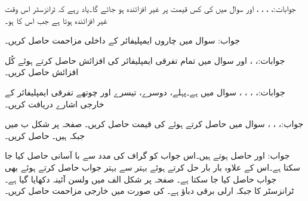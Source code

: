 جوابات:، ، ، ،  اور 
سوال  میں  کی کس قیمت پر  غیر افزائندہ ہو جائے گا۔یاد رہے کہ ٹرانزسٹر اس وقت غیر افزائندہ ہوتا ہے جب اس کا  ہو۔

جواب: 
سوال  میں چاروں ایمپلیفائر کے داخلی مزاحمت حاصل کریں۔

جوابات:، ،  اور 
سوال  میں  تمام تفرقی ایمپلیفائر کی افزائش حاصل کرتے ہوئے کُل افزائش  حاصل کریں۔

جوابات:، ، ، ، 
سوال  میں  ہے۔پہلے، دوسرے، تیسرے اور چوتھے تفرقی ایمپلیفائر کے خارجی اشارے دریافت کریں۔

جواب:، ، ، 
سوال   میں  حاصل کرتے ہوئے  کی قیمت حاصل کریں۔
صفحہ  پر شکل  ب میں  جبکہ  ہیں۔ حاصل کریں۔

جواب: اور   حاصل ہوتے ہیں۔اس جواب کو گراف کی مدد سے با آسانی حاصل کیا جا سکتا ہے۔اس کے علاوہ بار بار حل کرتے ہوئے بہتر سے بہتر جواب حاصل کرتے ہوئے بھی جواب حاصل کیا جا سکتا ہے۔ 
صفحہ  پر شکل  الف میں ولسن آئینہ دکھایا گیا ہے۔ٹرانزسٹر کا  جبکہ ارلی برقی دباؤ  ہے۔ کی صورت میں  خارجی مزاحمت  حاصل کریں۔

